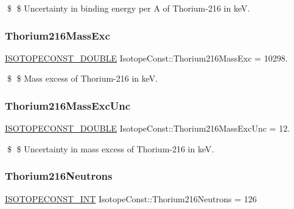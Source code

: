 \$ \$ Uncertainty in binding energy per A of Thorium-\/216 in keV. \mbox{\label{group___isotope_const-_thorium-_th216_ga9fcbfd64c1c3fb87e05b484c167f5d97}} 
\subsubsection{\texorpdfstring{Thorium216\+Mass\+Exc}{Thorium216MassExc}}
{\footnotesize\ttfamily \mbox{\hyperlink{group___isotope_const-_macros_ga8f45a7272ce02c0b4c65c44636ed719a}{I\+S\+O\+T\+O\+P\+E\+C\+O\+N\+S\+T\+\_\+\+D\+O\+U\+B\+LE}} Isotope\+Const\+::\+Thorium216\+Mass\+Exc = 10298.}

\$ \$ Mass excess of Thorium-\/216 in keV. \mbox{\label{group___isotope_const-_thorium-_th216_ga45f663ae810e33307dda4651bd249501}} 
\subsubsection{\texorpdfstring{Thorium216\+Mass\+Exc\+Unc}{Thorium216MassExcUnc}}
{\footnotesize\ttfamily \mbox{\hyperlink{group___isotope_const-_macros_ga8f45a7272ce02c0b4c65c44636ed719a}{I\+S\+O\+T\+O\+P\+E\+C\+O\+N\+S\+T\+\_\+\+D\+O\+U\+B\+LE}} Isotope\+Const\+::\+Thorium216\+Mass\+Exc\+Unc = 12.}

\$ \$ Uncertainty in mass excess of Thorium-\/216 in keV. \mbox{\label{group___isotope_const-_thorium-_th216_ga9f177d1864bde951a6b307502ba7cf6e}} 
\subsubsection{\texorpdfstring{Thorium216\+Neutrons}{Thorium216Neutrons}}
{\footnotesize\ttfamily \mbox{\hyperlink{group___isotope_const-_macros_ga5f18360b3e99483a35c32d789e62621c}{I\+S\+O\+T\+O\+P\+E\+C\+O\+N\+S\+T\+\_\+\+I\+NT}} Isotope\+Const\+::\+Thorium216\+Neutrons = 126}

